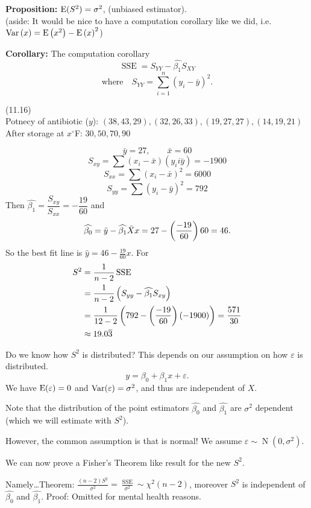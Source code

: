 \nnl \textbf{Proposition: } $\E*{S^2} = \sigma^2$, (unbiased estimator).\\(aside: It would be nice to have a computation corollary like we did, i.e. $\Var{x} = \E{x^2} - \E x^2$)

\nl \textbf{Corollary: } The computation corollary
$$\operatorname{SSE} = S_{YY} - \widehat{\beta_1} S_{XY}$$
$$\text{where} \quad S_{YY} = \sum_{i=1}^n (y_i - \bar y)^2.$$

\example (11.16)\\
Potnecy of antibiotic ($y$): $(38,43,29), (32,26,33), (19,27,27), (14,19,21)$
\\After storage at $x^{\circ}$F: $30, 50, 70, 90$

$$\bar y = 27, \qquad \bar x = 60$$
$$S_{xy} = \sum (x_i-\bar x)(y_i i \bar y) = -1900$$
$$S_{xx} = \sum (x_i - \bar x)^2 = 6000$$
$$S_{yy} = \sum (y_i - \bar y)^2 = 792$$
Then $\widehat{\beta_1}= \dfrac{S_{xy}}{S_{xx}} = -\dfrac{19}{60}$ and $$\widehat{\beta_0} = \bar y - \widehat{\beta_1} \Xbar x = 27 - \pfrac*{-19}{60}60 = 46.$$
So the best fit line is $\widehat y = 46 - \frac{19}{60}x$. For 
\begin{align*}
    S^2 &= \over{n-2}\operatorname{SSE}\\
    &= \over{n-2}\pars{S_{yy}-\widehat{\beta_1}S_{xy}}\\
    &= \over{12-2}\pars{792 - \pfrac{-19}{60}(-1900)} = \frac{571}{30}
    \\ &\approx 19.0\overline{3}
\end{align*}

\disc Do we know how $S^2$ is distributed? This depends on our assumption on how $\varepsilon$ is distributed. 
$$y = \beta_0 + \beta_1 x + \varepsilon.$$
We have $\E*{\varepsilon} = 0$ and $\Var*{\varepsilon} = \sigma^2$, and thus are independent of $X$. 

\nl Note that the distribution of the point estimators $\widehat{\beta_0}$ and $\widehat{\beta_1}$ are $\sigma^2$ dependent (which we will estimate with $S^2$).

\nl However, the common assumption is that  is normal! We assume $\varepsilon \sim \operatorname{N}(0, \sigma^2)$.

\nl We can now prove a Fisher's Theorem like result for the new $S^2$. 

\nl Namely\dots Theorem: $\displaystyle \frac{(n-2)S^2}{\sigma^2} = \frac{\operatorname{SSE}}{\sigma^2} \sim \chi^2(n-2)$, moreover $S^2$ is independent of $\widehat{\beta_0}$ and $\widehat{\beta_1}$. Proof: Omitted for mental health reasons. 